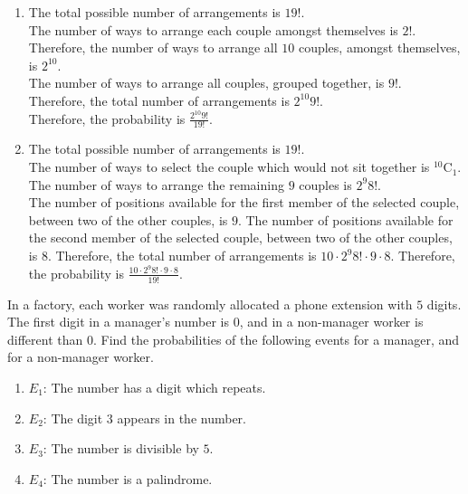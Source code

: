 \documentclass[fleqn, a4paper, 11pt, oneside]{amsart}
\theoremstyle{definition}
\theoremstyle{theorem}
\newcommand*{\comb}[2]{{}^{#1}\mathrm{C}_{#2}}%
\begin{document}
\begin{solution}
	\begin{enumerate}[leftmargin=*]
		\item
			The total possible number of arrangements is $19!$.\\
			The number of ways to arrange each couple amongst themselves is $2!$.
			Therefore, the number of ways to arrange all $10$ couples, amongst themselves, is $2^{10}$.\\
			The number of ways to arrange all couples, grouped together, is $9!$.\\
			Therefore, the total number of arrangements is $2^{10} 9!$.\\
			Therefore, the probability is $\frac{2^{10} 9!}{19!}$.
		\item
			The total possible number of arrangements is $19!$.\\
			The number of ways to select the couple which would not sit together is $\comb{10}{1}$.
			The number of ways to arrange the remaining $9$ couples is $2^9 8!$.\\
			The number of positions available for the first member of the selected couple, between two of the other couples, is $9$.
			The number of positions available for the second member of the selected couple, between two of the other couples, is $8$.
			Therefore, the total number of arrangements is $10 \cdot 2^9 8! \cdot 9 \cdot 8$.
			Therefore, the probability is $\frac{10 \cdot 2^9 8! \cdot 9 \cdot 8}{19!}$.
	\end{enumerate}
\end{solution}

\begin{question}
	In a factory, each worker was randomly allocated a phone extension with $5$ digits.
	The first digit in a manager's number is $0$, and in a non-manager worker is different than $0$.
	Find the probabilities of the following events for a manager, and for a non-manager worker.
	\begin{enumerate}
		\item $E_1$: The number has a digit which repeats.
		\item $E_2$: The digit $3$ appears in the number.
		\item $E_3$: The number is divisible by $5$.
		\item $E_4$: The number is a palindrome.
	\end{enumerate}
\end{question}
\end{document}
